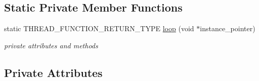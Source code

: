 \subsection*{Static Private Member Functions}
\begin{DoxyCompactItemize}
\item 
static T\+H\+R\+E\+A\+D\+\_\+\+F\+U\+N\+C\+T\+I\+O\+N\+\_\+\+R\+E\+T\+U\+R\+N\+\_\+\+T\+Y\+PE \hyperlink{classblmc__drivers_1_1CanBus_ab39625e5a1fea7d25d0967b4a48de0b4}{loop} (void $\ast$instance\+\_\+pointer)
\begin{DoxyCompactList}\small\item\em private attributes and methods \end{DoxyCompactList}\end{DoxyCompactItemize}
\subsection*{Private Attributes}
